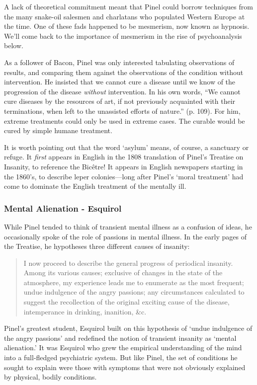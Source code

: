 \begin{refsection}
A lack of theoretical commitment meant that Pinel could borrow techniques from the many snake-oil salesmen and charlatans who populated Western Europe at the time. One of these fads happened to be mesmerism, now known as hypnosis. We'll come back to the importance of mesmerism in the rise of psychoanalysis below.

As a follower of Bacon, Pinel was only interested tabulating observations of results, and comparing them against the observations of the condition without intervention. He insisted that we cannot cure a disease until we know of the progression of the disease \emph{without} intervention. In his own words, ``We cannot cure diseases by the resources of art, if not previously acquainted with their terminations, when left to the unassisted efforts of nature.'' (p. 109). For him, extreme treatments could only be used in extreme cases. The curable would be cured by simple humane treatment.

It is worth pointing out that the word `asylum' means, of course, a sanctuary or refuge. It \emph{first} appears in English in the 1808 translation of Pinel's Treatise on Insanity, to reference the Bicêtre! It appears in English newspapers starting in the 1860's, to describe leper colonies---long after Pinel's `moral treatment' had come to dominate the English treatment of the mentally ill.

\subsubsection{Mental Alienation - Esquirol}
\label{mentalalienation-esquirol}

While Pinel tended to think of transient mental illness as a confusion of ideas, he occasionally spoke of the role of passions in mental illness. In the early pages of the Treatise, he hypotheses three different causes of insanity:

\begin{quote}

I now proceed to describe the general progress of periodical insanity. Among its various causes; exclusive of changes in the state of the atmosphere, my experience leads me to enumerate as the most frequent; undue indulgence of the angry passions; any circumstances calculated to suggest the recollection of the original exciting cause of the disease, intemperance in drinking, inanition, \&c. ~\citep[p. 12]{Pinel:1806ws}
\end{quote}

Pinel's greatest student, Esquirol built on this hypothesis of `undue indulgence of the angry passions' and redefined the notion of transient insanity as `mental alienation.' It was Esquirol who grew the empirical understanding of the mind into a full-fledged psychiatric system. But like Pinel, the set of conditions he sought to explain were those with symptoms that were not obviously explained by physical, bodily conditions.


\end{refsection}
